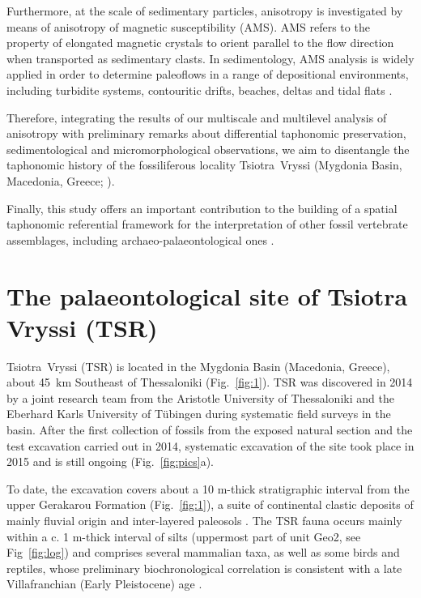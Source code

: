 \documentclass[5p,times,authoryear]{elsarticle}
\begin{document}
Furthermore, at the scale of sedimentary particles, anisotropy is investigated by means of anisotropy of magnetic susceptibility (AMS). AMS refers to the property of elongated magnetic crystals to orient parallel to the flow direction when transported as sedimentary clasts. In sedimentology, AMS analysis is widely applied in order to determine paleoflows in a range of depositional environments, including turbidite systems, contouritic drifts, beaches, deltas and tidal flats \citep[][among others]{Lowrie1987,Liu2001,Pares2007,Novak2014,Felletti2016}.

Therefore, integrating the results of our multiscale and multilevel analysis of anisotropy with preliminary remarks about differential taphonomic preservation, sedimentological and micromorphological observations, we aim to disentangle the taphonomic history of the fossiliferous locality Tsiotra~Vryssi (Mygdonia Basin, Macedonia, Greece; \citealp{Konidaris2015}).

Finally, this study offers an important contribution to the building of a spatial taphonomic referential framework for the interpretation of other fossil vertebrate assemblages, including archaeo-palaeontological ones \citep{Dominguez-Rodrigo2017}.

\section{The palaeontological site of Tsiotra Vryssi (TSR)}

Tsiotra~Vryssi (TSR) is located in the Mygdonia Basin (Macedonia, Greece), about 45~km Southeast of Thessaloniki (Fig.~\ref{fig:1}). TSR was discovered in 2014 by a joint research team from the Aristotle University of Thessaloniki and the Eberhard Karls University of Tübingen during systematic field surveys in the basin. After the first collection of fossils from the exposed natural section and the test excavation carried out in 2014, systematic excavation of the site took place in 2015 and is still ongoing (Fig.~\ref{fig:pics}a).

To date, the excavation covers about a 10 m-thick stratigraphic interval from the upper Gerakarou Formation (Fig.~\ref{fig:1}), a suite of continental clastic deposits of mainly fluvial origin and inter-layered paleosols \citep{Koufos1995,Konidaris2015}. The TSR fauna occurs mainly within a c. 1 m-thick interval of silts (uppermost part of unit Geo2, see Fig~\ref{fig:log}) and comprises several mammalian taxa, as well as some birds and reptiles, whose preliminary biochronological correlation is consistent with a late Villafranchian (Early Pleistocene) age \citep{Konidaris2015,Konidaris2016}.
\end{document}
